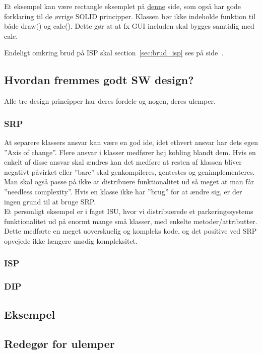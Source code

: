 Et eksempel kan være rectangle eksemplet på  \href{http://code.tutsplus.com/tutorials/solid-part-3-liskov-substitution-interface-segregation-principles--net-36710}{denne} side, som også har gode forklaring til de øvrige SOLID principper. Klassen bør ikke indeholde funktion til både draw() og calc(). Dette gør at at fx GUI includen skal bygges samtidig med calc.

Endeligt omkring brud på ISP skal section~\ref{sec:brud_isp} ses på side~\pageref{sec:brud_isp}.




\subsection{Hvordan fremmes godt SW design?}
Alle tre design principper har deres fordele og nogen, deres ulemper.

\subsubsection{SRP}
At separere klassers ansvar kan være en god ide, idet ethvert ansvar har dets egen ''Axis of change''. Flere ansvar i klasser medfører høj kobling blandt dem. Hvis en enkelt af disse ansvar skal ændres kan det medføre at resten af klassen bliver negativt påvirket eller ''bare'' skal genkompileres, gentestes og genimplementeres.\\

Man skal også passe på ikke at distribuere funktionalitet ud så meget at man får ”needless complexity”. Hvis en klasse ikke har ”brug” for at ændre sig, er der ingen grund til at bruge SRP.\\

Et personligt eksempel  er i faget ISU, hvor vi distribuerede et parkeringssystems funktionalitet ud på enormt mange små klasser, med enkelte metoder/attributter. Dette medførte en meget uoverskuelig og kompleks kode, og det positive ved SRP opvejede ikke længere unødig kompleksitet.

\subsubsection{ISP}

\subsubsection{DIP}

\subsection{Eksempel}

\subsection{Redegør for ulemper}